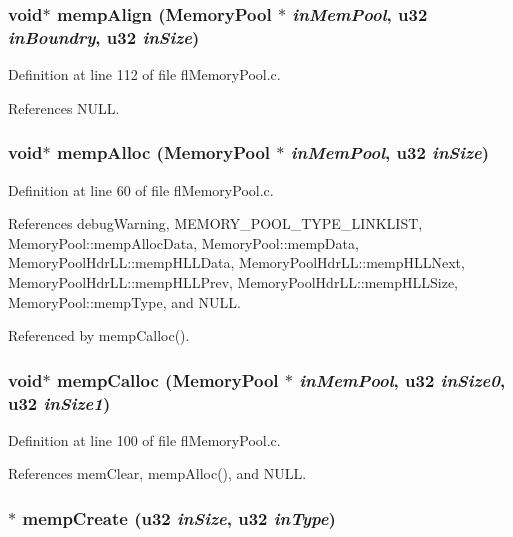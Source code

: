 \subsubsection{\setlength{\rightskip}{0pt plus 5cm}void$\ast$ memp\-Align ({\bf Memory\-Pool} $\ast$ {\em in\-Mem\-Pool}, u32 {\em in\-Boundry}, u32 {\em in\-Size})}\label{flMemoryPool_8h_8c5a1bdc836c08ee66a4551223b78a89}




Definition at line 112 of file fl\-Memory\-Pool.c.

References NULL.
\subsubsection{\setlength{\rightskip}{0pt plus 5cm}void$\ast$ memp\-Alloc ({\bf Memory\-Pool} $\ast$ {\em in\-Mem\-Pool}, u32 {\em in\-Size})}\label{flMemoryPool_8h_8347fb9bc94ce7ffbfeecd3a061524ae}




Definition at line 60 of file fl\-Memory\-Pool.c.

References debug\-Warning, MEMORY\_\-POOL\_\-TYPE\_\-LINKLIST, Memory\-Pool::memp\-Alloc\-Data, Memory\-Pool::memp\-Data, Memory\-Pool\-Hdr\-LL::memp\-HLLData, Memory\-Pool\-Hdr\-LL::memp\-HLLNext, Memory\-Pool\-Hdr\-LL::memp\-HLLPrev, Memory\-Pool\-Hdr\-LL::memp\-HLLSize, Memory\-Pool::memp\-Type, and NULL.

Referenced by memp\-Calloc().
\subsubsection{\setlength{\rightskip}{0pt plus 5cm}void$\ast$ memp\-Calloc ({\bf Memory\-Pool} $\ast$ {\em in\-Mem\-Pool}, u32 {\em in\-Size0}, u32 {\em in\-Size1})}\label{flMemoryPool_8h_22a72c10177a340b5451f0f21d7ae2a2}




Definition at line 100 of file fl\-Memory\-Pool.c.

References mem\-Clear, memp\-Alloc(), and NULL.
\subsubsection{$\ast$ memp\-Create (u32 {\em in\-Size}, u32 {\em in\-Type})}\label{flMemoryPool_8h_2dcdd7fd2c4b14a1f1c2a692d6d99e12}





